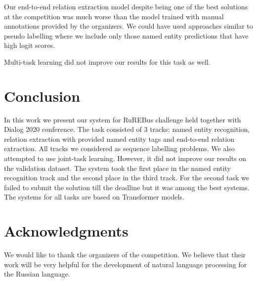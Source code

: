 \documentclass{dialogue}
\begin{document}
Our end-to-end relation extraction model despite being one of the best solutions at the competition was much worse than the model trained with manual annotations provided by the organizers. We could have used approaches similar to pseudo labelling where we include only those named entity predictions that have high logit scores.

Multi-task learning did not improve our results for this task as well. 
\section{Conclusion}
In this work we present our system for RuREBus challenge held together with Dialog 2020 conference. The task consisted of 3 tracks: named entity recognition, relation extraction with provided named entity tags and end-to-end relation extraction. All tracks we considered as sequence labelling problems. We also attempted to use joint-task learning. However, it did not improve our results on the validation dataset. The system took the first place in the named entity recognition track and the second place in the third track. For the second task we failed to submit the solution till the deadline but it was among the best systems. The systems for all tasks are based on Transformer models.

\section{Acknowledgments}
We would like to thank the organizers of the competition. We believe that their work will be very helpful for the development of natural language processing for the Russian language.

\end{document}

